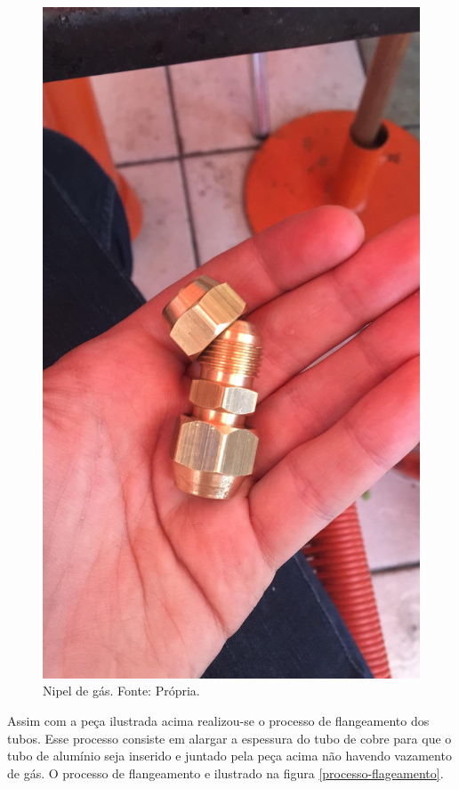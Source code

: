                         \begin{figure}[!htb]
                            \centering
                            \includegraphics[scale= 0.2]{figuras/nipel-gas.png}
                            \caption{Nipel de gás. Fonte: Própria.}
                            \label{nipel-gas}
                        \end{figure}

                        Assim com a peça ilustrada acima realizou-se o processo de flangeamento dos tubos. Esse
                        processo consiste em alargar a espessura do tubo de cobre para que o tubo de alumínio
                        seja inserido e juntado pela peça acima não havendo vazamento de gás. O processo de
                        flangeamento e ilustrado na figura \ref{processo-flageamento}. 

